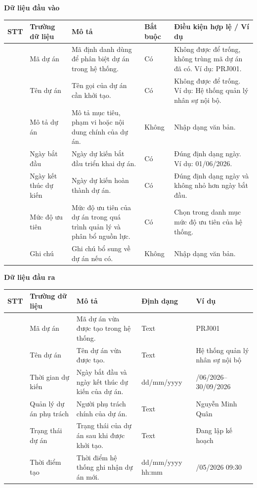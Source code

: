 \documentclass[../DoAn.tex]{subfiles}
\begin{document}
\textbf{Dữ liệu đầu vào}

{\ucDataText
\begin{longtable}{|>{\centering\arraybackslash}p{}|>{\raggedright\arraybackslash}p{}|>{\raggedright\arraybackslash}p{}|>{\raggedright\arraybackslash}p{}|>{\raggedright\arraybackslash}p{}|}
\hline
\rowcolor{ucHeaderBg}\textbf{STT} & \textbf{Trường dữ liệu} & \textbf{Mô tả} & \textbf{Bắt buộc} & \textbf{Điều kiện hợp lệ / Ví dụ} \\ \hline
1 & Mã dự án & Mã định danh dùng để phân biệt dự án trong hệ thống. & Có & Không được để trống, không trùng mã dự án đã có. Ví dụ: PRJ001. \\ \hline
2 & Tên dự án & Tên gọi của dự án cần khởi tạo. & Có & Không được để trống. Ví dụ: Hệ thống quản lý nhân sự nội bộ. \\ \hline
3 & Mô tả dự án & Mô tả mục tiêu, phạm vi hoặc nội dung chính của dự án. & Không & Nhập dạng văn bản. \\ \hline
4 & Ngày bắt đầu & Ngày dự kiến bắt đầu triển khai dự án. & Có & Đúng định dạng ngày. Ví dụ: 01/06/2026. \\ \hline
5 & Ngày kết thúc dự kiến & Ngày dự kiến hoàn thành dự án. & Có & Đúng định dạng ngày và không nhỏ hơn ngày bắt đầu. \\ \hline
6 & Mức độ ưu tiên & Mức độ ưu tiên của dự án trong quá trình quản lý và phân bổ nguồn lực. & Có & Chọn trong danh mục mức độ ưu tiên của hệ thống. \\ \hline
7 & Ghi chú & Ghi chú bổ sung về dự án nếu có. & Không & Nhập dạng văn bản. \\ \hline
\end{longtable}
}

\textbf{Dữ liệu đầu ra}

{\ucDataText
\begin{longtable}{|>{\centering\arraybackslash}p{}|>{\raggedright\arraybackslash}p{}|>{\raggedright\arraybackslash}p{}|>{\raggedright\arraybackslash}p{}|>{\raggedright\arraybackslash}p{}|}
\hline
\rowcolor{ucHeaderBg}\textbf{STT} & \textbf{Trường dữ liệu} & \textbf{Mô tả} & \textbf{Định dạng} & \textbf{Ví dụ} \\ \hline
1 & Mã dự án & Mã dự án vừa được tạo trong hệ thống. & Text & PRJ001 \\ \hline
2 & Tên dự án & Tên dự án vừa được tạo. & Text & Hệ thống quản lý nhân sự nội bộ \\ \hline
3 & Thời gian dự kiến & Ngày bắt đầu và ngày kết thúc dự kiến của dự án. & dd/mm/yyyy & 01/06/2026--30/09/2026 \\ \hline
4 & Quản lý dự án phụ trách & Người phụ trách chính của dự án. & Text & Nguyễn Minh Quân \\ \hline
5 & Trạng thái dự án & Trạng thái của dự án sau khi được khởi tạo. & Text & Đang lập kế hoạch \\ \hline
6 & Thời điểm tạo & Thời điểm hệ thống ghi nhận dự án mới. & dd/mm/yyyy hh:mm & 21/05/2026 09:30 \\ \hline
\end{longtable}
}
\end{document}
